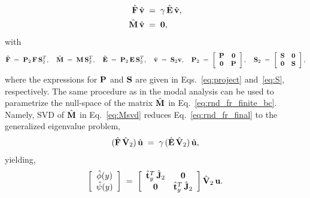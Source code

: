 \documentclass[%
secnumarabic,%
 amssymb, amsmath,%
 aps,prf,superscriptaddress,longbibliography
frontmatterverbose,
]{revtex4-2}
\begin{document}
\begin{subequations}\label{eq:rnd_fr_final}
\begin{align}
  \hat {\mathbf{F}} \, \hat{\mathbf{v}} \;&=\; \gamma \,\hat{\mathbf{E}} \,\hat{\mathbf{v}},\\
  \hat{\mathbf{M}} \,\hat{\mathbf{v}} \;&=\; \mathbf 0,\label{eq:rnd_fr_finite_bc}
\end{align}
\end{subequations}
with
	$$
	\hat{\mathbf{F}} 
	\;=\;  
	\mathbf{P}_{2} \, \mathbf{F} \, \mathbf{S}_2^T, 
	\quad 
	\hat{\mathbf{M}} 
	\;=\;  
	\mathbf{M} \, \mathbf{S}_{2}^T, 
	\quad 
	\hat{\mathbf{E}} 
	\;=\;  
	\mathbf{P}_{2} \, \mathbf{E} \, \mathbf{S}_2^T, 
	\quad 
	\hat{\mathbf{v}} 
	\;=\; 
	\mathbf{S}_2 {\mathbf{v}},
	\quad
	\mathbf{P}_{2} 
	\;=\; 
	\left[\begin{array}{cc}
	\mathbf{P} & \mathbf 0  \\
	\mathbf 0 & \mathbf{P}
	\end{array}\right], 
	\quad  
	\mathbf{S}_{2} 
	\;=\; 
	\left[\begin{array}{cc}
  	\mathbf{S} & \mathbf 0\\
  	\mathbf 0 & \mathbf{S}
  	\end{array}\right],
	$$
where the expressions for $\mathbf{P}$ and $\mathbf{S}$ are given in Eqs.~\eqref{eq:project} and~\eqref{eq:S}, respectively. The same procedure as in the modal analysis can be used to parametrize the null-space of the matrix $\hat{\mathbf{M}}$ in Eq.~\eqref{eq:rnd_fr_finite_bc}. Namely, SVD of $\hat{\mathbf{M}}$ in Eq.~\eqref{eq:Msvd} reduces Eq.~\eqref{eq:rnd_fr_final} to the generalized eigenvalue problem,
\begin{align}
  (\hat{\mathbf{F}} \,\hat{\mathbf{V}}_{2})\,\hat{\mathbf{u}} \;=\; \gamma \,(\hat{\mathbf{E}}\, \hat{\mathbf{V}}_{2})\, \hat{\mathbf{u}},
\end{align}
yielding,
\begin{align}
  \left[\begin{array}{c}
    \hat{\phi} (y)\\
    \hat{\psi} (y)
  \end{array}\right] 
  \; = \; 
  \left[\begin{array}{cc}
    \hat{\mathbf{t}}_y^T \, \hat{\mathbf{J}}_2 & \mathbf 0\\
    \mathbf 0 & \hat{\mathbf{t}}_y^T \, \hat{\mathbf{J}}_2
  \end{array}\right] \hat{\mathbf{V}}_{2} \, \mathbf{u}.
\end{align}     
\end{document}

